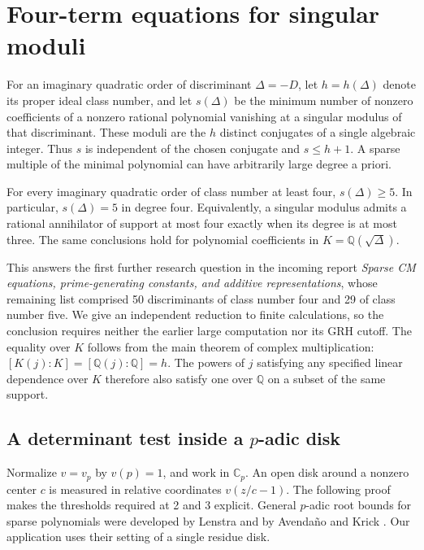 \section{Four-term equations for singular moduli}
For an imaginary quadratic order of discriminant $\Delta=-D$, let $h=h(\Delta)$ denote its proper ideal class number, and let $s(\Delta)$ be the minimum number of nonzero coefficients of a nonzero rational polynomial vanishing at a singular modulus of that discriminant. These moduli are the $h$ distinct conjugates of a single algebraic integer. Thus $s$ is independent of the chosen conjugate and $s\le h+1$. A sparse multiple of the minimal polynomial can have arbitrarily large degree a priori.

\begin{theorem}\label{th:four}
For every imaginary quadratic order of class number at least four,
$s(\Delta)\ge5$. In particular, $s(\Delta)=5$ in degree four.
Equivalently, a singular modulus admits a rational annihilator of support at most four exactly when its degree is at most three. The same conclusions hold for polynomial coefficients in $K=\mathbb Q(\sqrt\Delta)$.
\end{theorem}

This answers the first further research question in the incoming report \emph{Sparse CM equations, prime-generating constants, and additive representations}, whose remaining list comprised 50 discriminants of class number four and 29 of class number five. We give an independent reduction to finite calculations, so the conclusion requires neither the earlier large computation nor its GRH cutoff. The equality over $K$ follows from the main theorem of complex multiplication: $[K(j):K]=[\mathbb Q(j):\mathbb Q]=h$. The powers of $j$ satisfying any specified linear dependence over $K$ therefore also satisfy one over $\mathbb Q$ on a subset of the same support.

\subsection{A determinant test inside a \texorpdfstring{$p$}{p}-adic disk}
Normalize $v=v_p$ by $v(p)=1$, and work in $\mathbb C_p$. An open disk around a nonzero center $c$ is measured in relative coordinates $v(z/c-1)$. The following proof makes the thresholds required at 2 and 3 explicit. General $p$-adic root bounds for sparse polynomials were developed by Lenstra and by Avenda\~no and Krick \cite{lenstra,avk}. Our application uses their setting of a single residue disk.

